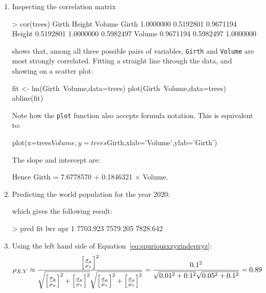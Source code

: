\begin{enumerate}

\item Inspecting the correlation matrix
  
\begin{script}
> cor(trees)
           Girth    Height    Volume
Girth  1.0000000 0.5192801 0.9671194
Height 0.5192801 1.0000000 0.5982497
Volume 0.9671194 0.5982497 1.0000000
\end{script}

\noindent shows that, among all three possible pairs of variables,
\texttt{Girth} and \texttt{Volume} are most strongly correlated.
Fitting a straight line through the data, and showing on a scatter
plot:

\begin{script}
fit <- lm(Girth~Volume,data=trees)
plot(Girth~Volume,data=trees)
abline(fit)
\end{script}

Note how the \texttt{plot} function also accepts formula
notation. This is equivalent to:

\begin{script}[firstnumber=2]
plot(x=trees$Volume,y=trees$Girth,xlab='Volume',ylab='Girth')
\end{script}
  
The slope and intercept are:


Hence Girth = 7.6778570 + 0.1846321 $\times$ Volume.

\item Predicting the world population for the year 2020:


\noindent which gives the following result:

\begin{console}
> pred
       fit      lwr      upr
1 7703.923 7579.205 7828.642
\end{console}

\item Using the left hand side of
  Equation~\ref{eq:spuriousxzyzindepxyz}:
  \[
  \noindent \rho_{X,Y} \approx
  \frac{
    \left[\frac{\sigma_z}{\mu_z}\right]^2
  }{
    \sqrt{\left[\frac{\sigma_y}{\mu_y}\right]^2 +
      \left[\frac{\sigma_z}{\mu_z}\right]^2}
    \sqrt{\left[\frac{\sigma_x}{\mu_x}\right]^2 +
      \left[\frac{\sigma_z}{\mu_z}\right]^2}
  }
  =
  \frac{
    0.1^2
  }{
    \sqrt{0.01^2 + 0.1^2}\sqrt{0.05^2 + 0.1^2}
  }
  = 0.89
  \]


\end{enumerate}
